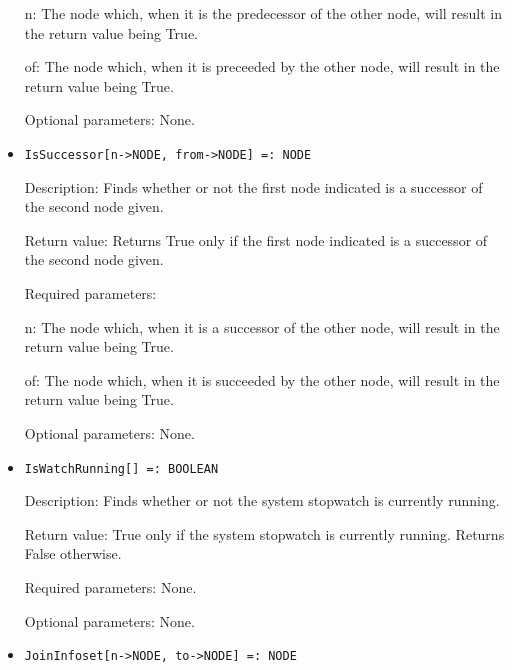 \begin{itemize}
\bd
\item
[n:] The node which, when it is the predecessor of the other node,
will result in the return value being True.
\item
[of:] The node which, when it is preceeded by the other node, will
result in the return value being True.
\ed

\item
[Optional parameters:] None.
\ed

\item
\protect \large \begin{verbatim}
IsSuccessor[n->NODE, from->NODE] =: NODE
\end{verbatim}\normalsize

\bd
\item
[Description:] Finds whether or not the first node indicated is a
successor of the second node given.
\item
[Return value:] Returns True only if the first node indicated is a
successor of the second node given.
\item
[Required parameters:]\hfil\null
	
\bd
\item
[n:] The node which, when it is a successor of the other node, will
result in the return value being True.
\item
[of:] The node which, when it is succeeded by the other node, will
result in the return value being True.
\ed

\item
[Optional parameters:] None.
\ed

\item
\protect \large \begin{verbatim}
IsWatchRunning[] =: BOOLEAN
\end{verbatim}\normalsize

\bd
\item
[Description:] Finds whether or not the system stopwatch is currently
running.
\item
[Return value:] True only if the system stopwatch is currently
running.  Returns False otherwise.
\item
[Required parameters:] None.
\item
[Optional parameters:] None.
\ed

\item
\protect \large \begin{verbatim}
JoinInfoset[n->NODE, to->NODE] =: NODE
\end{verbatim}\normalsize


\end{itemize}
